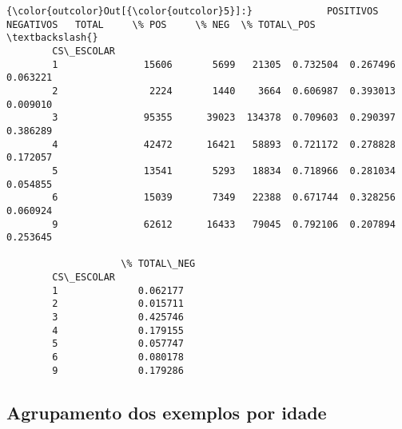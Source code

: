 \documentclass[11pt]{article}
\begin{document}
\begin{Verbatim}[commandchars=\\\{\}]
{\color{outcolor}Out[{\color{outcolor}5}]:}             POSITIVOS  NEGATIVOS   TOTAL     \% POS     \% NEG  \% TOTAL\_POS  \textbackslash{}
        CS\_ESCOLAR                                                                  
        1               15606       5699   21305  0.732504  0.267496     0.063221   
        2                2224       1440    3664  0.606987  0.393013     0.009010   
        3               95355      39023  134378  0.709603  0.290397     0.386289   
        4               42472      16421   58893  0.721172  0.278828     0.172057   
        5               13541       5293   18834  0.718966  0.281034     0.054855   
        6               15039       7349   22388  0.671744  0.328256     0.060924   
        9               62612      16433   79045  0.792106  0.207894     0.253645   
        
                    \% TOTAL\_NEG  
        CS\_ESCOLAR               
        1              0.062177  
        2              0.015711  
        3              0.425746  
        4              0.179155  
        5              0.057747  
        6              0.080178  
        9              0.179286  
\end{Verbatim}
            
    \subsection{Agrupamento dos exemplos por
idade}\label{agrupamento-dos-exemplos-por-idade}
\end{document}
